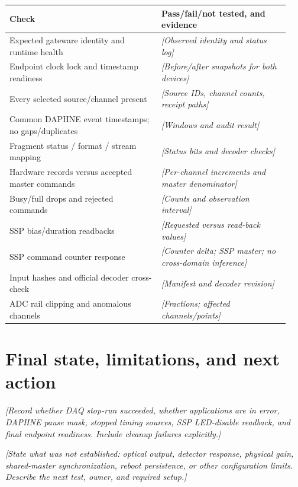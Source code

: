 \documentclass[11pt,a4paper]{article}
\newcommand{\entry}[1]{\textcolor{blue!60!black}{\textit{[#1]}}}
\begin{document}
\begin{longtable}{@{}p{0.51\linewidth}p{0.43\linewidth}@{}}\toprule
Check & Pass/fail/not tested, and evidence \\\midrule\endhead
Expected gateware identity and runtime health & \entry{Observed identity and status log} \\
Endpoint clock lock and timestamp readiness & \entry{Before/after snapshots for both devices} \\
Every selected source/channel present & \entry{Source IDs, channel counts, receipt paths} \\
Common DAPHNE event timestamps; no gaps/duplicates & \entry{Windows and audit result} \\
Fragment status / format / stream mapping & \entry{Status bits and decoder checks} \\
Hardware records versus accepted master commands & \entry{Per-channel increments and master denominator} \\
Busy/full drops and rejected commands & \entry{Counts and observation interval} \\
SSP bias/duration readbacks & \entry{Requested versus read-back values} \\
SSP command counter response & \entry{Counter delta; SSP master; no cross-domain inference} \\
Input hashes and official decoder cross-check & \entry{Manifest and decoder revision} \\
ADC rail clipping and anomalous channels & \entry{Fractions; affected channels/points} \\
\bottomrule\end{longtable}

\section{Final state, limitations, and next action}
\entry{Record whether DAQ stop-run succeeded, whether applications are in error, DAPHNE pause mask, stopped timing sources, SSP LED-disable readback, and final endpoint readiness. Include cleanup failures explicitly.}

\entry{State what was not established: optical output, detector response, physical gain, shared-master synchronization, reboot persistence, or other configuration limits. Describe the next test, owner, and required setup.}
\end{document}
